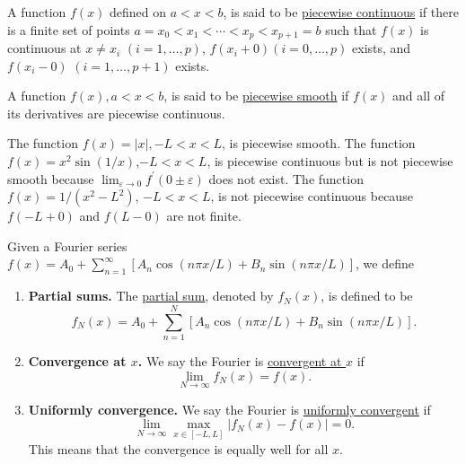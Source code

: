 \begin{definition}
    A function $f(x)$ defined on $a<x<b$, is said to be \underline{piecewise continuous} if there is a finite set of points $a=x_0<x_1<\cdots<x_p<x_{p+1}=b$ such that $f(x)$ is continuous at $x \neq x_i$ $(i=1, \ldots, p)$, $f(x_i+0)(i=0, \ldots, p)$ exists, and $f(x_i-0)$ $(i=1, \ldots, p+1)$ exists.
\end{definition}

\begin{definition}
    A function $f(x), a<x<b$, is said to be \underline{piecewise smooth} if $f(x)$ and all of its derivatives are piecewise continuous.
\end{definition}



\begin{example}[]
    The function $f(x)=|x|,-L<x<L$, is piecewise smooth. The function $f(x)=x^2 \sin (1 / x)$,$-L<x<L$, is piecewise continuous but is not piecewise smooth because $\lim _{\varepsilon \rightarrow 0} f^{\prime}(0 \pm \varepsilon)$ does not exist. The function $f(x)=1 /\left(x^2-L^2\right)$, $-L<x<L$, is not piecewise continuous because $f(-L+0)$ and $f(L-0)$ are not finite.
\end{example}

\begin{definition}[Convergence]\label{def.convergence}
Given a Fourier series $f(x) = A_0+\sum_{n=1}^{\infty}[A_n \cos (n \pi x / L)+B_n \sin (n \pi x / L)]$, we define
\begin{enumerate}
    \item \textbf{Partial sums.} The \underline{partial sum}, denoted by $f_N(x)$, is defined to be
    \begin{equation}\label{eq.partial_sum}
        f_N(x)=A_0+\sum_{n=1}^N\left[A_n \cos (n \pi x / L)+B_n \sin (n \pi x / L)\right] .
    \end{equation}
    \item \textbf{Convergence at $x$.} We say the Fourier is \underline{convergent at $x$} if 
    \begin{equation}\label{eq.convergence_at_x}
        \lim_{N\rightarrow\infty}f_N(x) = f(x).
    \end{equation}
    \item \textbf{Uniformly convergence.} We say the Fourier is \underline{uniformly convergent} if 
    \begin{equation}\label{eq.convergence_uniformly}
        \lim_{N\rightarrow\infty} \max_{x\in [-L,L]}|f_N(x) - f(x)| = 0.
    \end{equation}
    This means that the convergence is equally well for all $x$.
\end{enumerate}

\end{definition}

